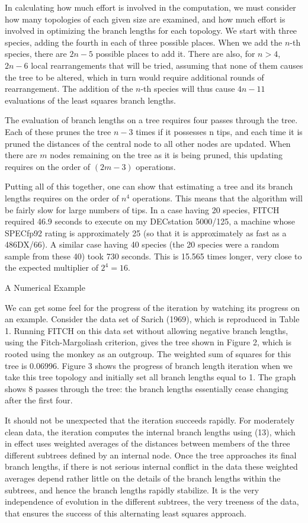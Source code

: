 \documentclass[12pt]{article}
\begin{document}
In calculating how much effort is involved in the computation, we must
consider how many topologies of each given size are examined, and how much
effort is involved in optimizing the branch lengths for each topology.
We start with three species, adding the fourth in each of three possible
places.  When we add the $n$-th species, there are $2n-5$ possible places to add
it.  There are also, for $n > 4$, $2n-6$ local rearrangements that will be
tried, assuming that none of them causes the tree to be altered, which in
turn would require additional rounds of rearrangement.  The addition of the 
$n$-th species will thus cause $4n-11$ evaluations
of the least squares branch lengths.

The evaluation of branch lengths on a tree requires four passes through the
tree.  Each of these prunes the tree $n-3$ times if it possesses n tips, and
each time it is pruned the distances of the central node to all other nodes
are updated.  When there are $m$ nodes remaining on the tree as it is being
pruned, this updating requires on the order of $(2m-3)$ operations.

Putting all of this together, one can show that estimating a tree and its
branch lengths requires on the order of $n^4$ operations.  This means that
the algorithm will be fairly slow for large numbers of tips.  In a case
having 20 species, FITCH required 46.9 seconds to execute on my DECstation
5000/125, a machine whose SPECfp92 rating is approximately 25 (so that it is approximately
as fast as a 486DX/66).   A similar case
having 40 species (the 20 species were a random sample from these 40)
took 730 seconds.  This is 15.565 times longer, very close to the expected
multiplier of $2^4 = 16$.
\bigskip

\centerline{\sc A Numerical Example}
\bigskip

We can get some feel for the progress of the iteration by watching its
progress on an example.  Consider the data set of Sarich (1969), which is
reproduced in Table 1.  Running FITCH on this data set without allowing
negative branch lengths, using the Fitch-Margoliash criterion, gives the
tree shown in Figure 2, which is rooted using the monkey as an 
outgroup.  The weighted sum of squares for this tree is 0.06996.  Figure 3 
shows the progress of branch length
iteration when we take this tree topology and initially set all branch
lengths equal to 1.  The graph shows 8 passes through the tree: the
branch lengths essentially cease changing after the first four.

It should not be unexpected that the iteration succeeds rapidly.  For
moderately clean data, the iteration computes the internal branch lengths
using (13), which in effect uses weighted averages of the distances between
members of the three different subtrees defined by an internal node.  Once
the tree approaches its final branch lengths, if there is not serious
internal conflict in the data these weighted averages depend rather little
on the details of the branch lengths within the subtrees, and hence the branch 
lengths rapidly stabilize.  It is the very independence of evolution in the 
different
subtrees, the very treeness of the data, that ensures the success of this
alternating least squares approach.
\bigskip
\end{document}
